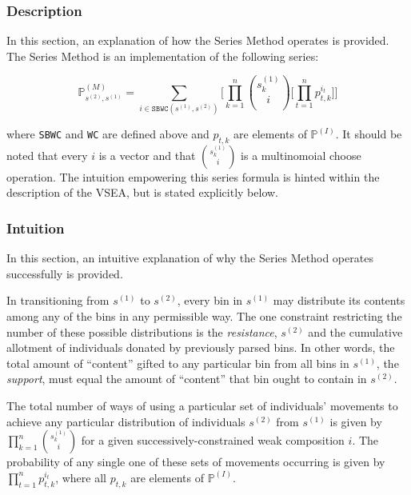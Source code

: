\documentclass{article}
\begin{document}
\subsubsection{Description}
In this section, an explanation of how the Series Method operates is provided. The Series Method is an implementation of the following series:

\begin{equation}\label{series}
    \mathbb{P}^{(M)}_{s^{(2)},s^{(1)}} = \sum_{i \in \texttt{SBWC}(s^{(1)}, s^{(2)})} \Bigg[\prod_{k=1}^n {s^{(1)}_k \choose i}  \bigg[ \prod_{t=1}^n p_{t,k}^{i_t} \bigg] \Bigg]
\end{equation}

where \texttt{SBWC} and \texttt{WC} are defined above and $p_{t,k}$ are elements of $\mathbb{P}^{(I)}$. It should be noted that every $i$ is a vector and that ${s^{(1)}_k \choose i}$ is a multinomoial choose operation. The intuition empowering this series formula is hinted within the description of the VSEA, but is stated explicitly below.

\subsubsection{Intuition}
In this section, an intuitive explanation of why the Series Method operates successfully is provided.

In transitioning from $s^{(1)}$ to $s^{(2)}$, every bin in $s^{(1)}$ may distribute its contents among any of the bins in any permissible way. The one constraint restricting the number of these possible distributions is the \textit{resistance}, $s^{(2)}$ and the cumulative allotment of individuals donated by previously parsed bins. In other words, the total amount of ``content'' gifted to any particular bin from all bins in $s^{(1)}$, the \textit{support}, must equal the amount of ``content'' that bin ought to contain in $s^{(2)}$.

The total number of ways of using a particular set of individuals' movements to achieve any particular distribution of individuals $s^{(2)}$ from $s^{(1)}$ is given by $\prod_{k=1}^n {s^{(1)}_k \choose i}$ for a given successively-constrained weak composition $i$. The probability of any single one of these sets of movements occurring is given by $\prod_{t=1}^n p_{t,k}^{i_t}$, where all $p_{t,k}$ are elements of $\mathbb{P}^{(I)}$.

\end{document}

